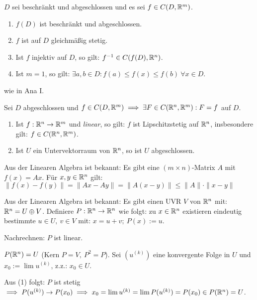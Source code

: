 \documentclass[a4paper,oneside,DIV15,BCOR12mm,chapterprefix=true,headings=onelinechapter]{scrbook}
\begin{document}
\begin{satz}
$D$ sei beschränkt und abgeschlossen und es sei $f \in C(D,\mathbb{R}^m)$.
\begin{enumerate}
\item $f(D)$ ist beschränkt und abgeschlossen.
\item $f$ ist auf $D$ gleichmäßig stetig.
\item Ist $f$ injektiv auf $D$, so gilt: $f^{-1} \in C(f(D),\mathbb{R}^n)$.
\item Ist $m = 1$, so gilt: $\exists a,b \in D: f(a) \le f(x) \le f(b)\ \forall x \in D$.
\end{enumerate}
\end{satz}

\begin{beweis}
wie in Ana I.
\end{beweis}

\begin{satz}
Sei $D$ abgeschlossen und $f \in C(D,\mathbb{R}^m) \implies \exists F \in C(\mathbb{R}^n,\mathbb{R}^m): F=f$ auf $D$.
\end{satz}

\begin{satz}
\begin{enumerate}
\item Ist $f:\mathbb{R}^n \to \mathbb{R}^m$ und \emph{linear}, so gilt: $f$ ist Lipschitzstetig auf $\mathbb{R}^n$, insbesondere gilt: $f \in C(\mathbb{R}^n,\mathbb{R}^m)$.
\item Ist $U$ ein Untervektorraum von $\mathbb{R}^n$, so ist $U$ abgeschlossen.
\end{enumerate}
\end{satz}

\begin{beweise}
\item Aus der Linearen Algebra ist bekannt: Es gibt eine $(m \times n)$-Matrix $A$ mit $f(x) = Ax$. Für $x,y \in \mathbb{R}^n$ gilt: $\|f(x)-f(y)\| = \|Ax - Ay\| = \|A(x-y)\| \le \|A\|\cdot \|x-y\|$

\item Aus der Linearen Algebra ist bekannt: Es gibt einen UVR $V$ von $\mathbb{R}^n$ mit: $\mathbb{R}^n = U \oplus V$. Definiere $P: \mathbb{R}^n \to \mathbb{R}^n$ wie folgt: zu $x \in \mathbb{R}^n$ existieren eindeutig bestimmte $u \in U,\ v \in V$ mit: $x = u+v;\ P(x) := u$.

Nachrechnen: $P$ ist linear.

$P(\mathbb{R}^n) = U$ (Kern $P = V,\ P^2 = P$). Sei $(u^{(k)})$ eine konvergente Folge in $U$ und $x_0 := \lim u^{(k)}$, z.z.: $x_0 \in U$.

Aus (1) folgt: $P$ ist stetig $\implies P(u^{(k)}) \to P(x_0) \implies x_0 = \lim u^{(k)} = \lim P(u^{(k)}) = P(x_0) \in P(\mathbb{R}^n) = U$.
\end{beweise}
\end{document}
